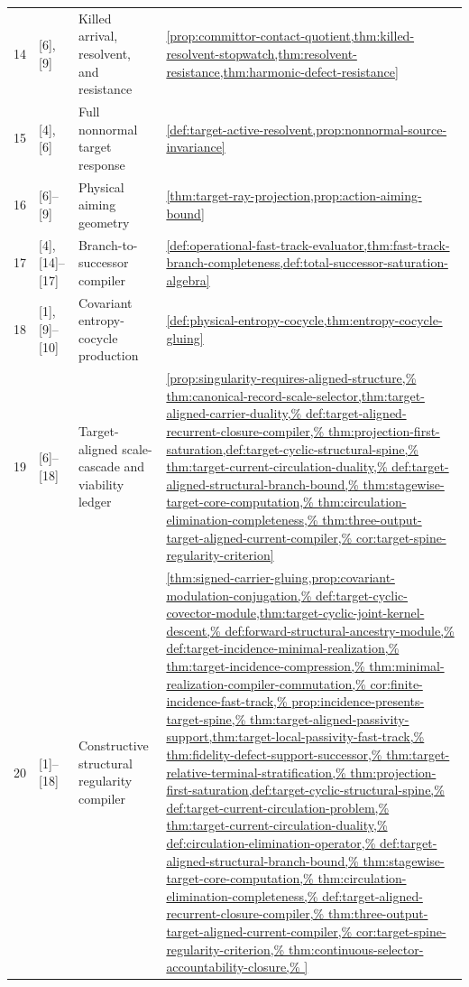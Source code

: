 \documentclass[11pt]{article}
\numberwithin{section}{part}
\theoremstyle{plain}
\theoremstyle{definition}
\theoremstyle{remark}
\begin{document}
\begin{longtable}{p{.055\linewidth}p{.105\linewidth}p{.30\linewidth}p{.43\linewidth}}
14 & [6], [9] & Killed arrival, resolvent, and resistance &
\cref{prop:committor-contact-quotient,thm:killed-resolvent-stopwatch,thm:resolvent-resistance,thm:harmonic-defect-resistance}\\
15 & [4], [6] & Full nonnormal target response &
\cref{def:target-active-resolvent,prop:nonnormal-source-invariance}\\
16 & [6]--[9] & Physical aiming geometry &
\cref{thm:target-ray-projection,prop:action-aiming-bound}\\
17 & [4], [14]--[17] & Branch-to-successor compiler &
\cref{def:operational-fast-track-evaluator,thm:fast-track-branch-completeness,def:total-successor-saturation-algebra}\\
18 & [1], [9]--[10] & Covariant entropy-cocycle production &
\cref{def:physical-entropy-cocycle,thm:entropy-cocycle-gluing}\\
19 & [6]--[18] & Target-aligned scale-cascade and viability ledger &
\cref{prop:singularity-requires-aligned-structure,%
thm:canonical-record-scale-selector,thm:target-aligned-carrier-duality,%
def:target-aligned-recurrent-closure-compiler,%
thm:projection-first-saturation,def:target-cyclic-structural-spine,%
thm:target-current-circulation-duality,%
def:target-aligned-structural-branch-bound,%
thm:stagewise-target-core-computation,%
thm:circulation-elimination-completeness,%
thm:three-output-target-aligned-current-compiler,%
cor:target-spine-regularity-criterion}\\
20 & [1]--[18] & Constructive structural regularity compiler &
\cref{thm:signed-carrier-gluing,prop:covariant-modulation-conjugation,%
def:target-cyclic-covector-module,thm:target-cyclic-joint-kernel-descent,%
def:forward-structural-ancestry-module,%
def:target-incidence-minimal-realization,%
thm:target-incidence-compression,%
thm:minimal-realization-compiler-commutation,%
cor:finite-incidence-fast-track,%
prop:incidence-presents-target-spine,%
thm:target-aligned-passivity-support,thm:target-local-passivity-fast-track,%
thm:fidelity-defect-support-successor,%
thm:target-relative-terminal-stratification,%
thm:projection-first-saturation,def:target-cyclic-structural-spine,%
def:target-current-circulation-problem,%
thm:target-current-circulation-duality,%
def:circulation-elimination-operator,%
def:target-aligned-structural-branch-bound,%
thm:stagewise-target-core-computation,%
thm:circulation-elimination-completeness,%
def:target-aligned-recurrent-closure-compiler,%
thm:three-output-target-aligned-current-compiler,%
cor:target-spine-regularity-criterion,%
thm:continuous-selector-accountability-closure,%
}
\end{longtable}
\end{document}
